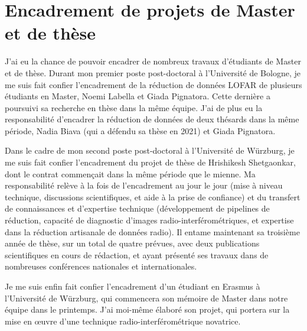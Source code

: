 \section{Encadrement de projets de Master et de th\`ese}

\pg
J'ai eu la chance de pouvoir encadrer de nombreux travaux d'\'etudiants de Master et de th\`ese. Durant mon premier poste post-doctoral \`a l'Universit\'e de Bologne, je me suis fait confier l'encadrement de la r\'eduction de donn\'ees LOFAR de plusieurs \'etudiants en Master, Noemi Labella et Giada Pignatora. Cette derni\`ere a poursuivi sa recherche en th\`ese dans la m\^eme \'equipe. J'ai de plus eu la responsabilit\'e d'encadrer la r\'eduction de donn\'ees de deux th\'esards dans la m\^eme p\'eriode, Nadia Biava (qui a d\'efendu sa th\`ese en 2021) et Giada Pignatora.

\pg
Dans le cadre de mon second poste post-doctoral \`a l'Universit\'e de W\"urzburg, je me suis fait confier l'encadrement du projet de th\`ese de Hrishikesh Shetgaonkar, dont le contrat commen\c{c}ait dans la m\^eme p\'eriode que le mienne. Ma responsabilit\'e rel\`eve \`a la fois de l'encadrement au jour le jour (mise \`a niveau technique, discussions scientifiques, et aide \`a la prise de confiance) et du transfert de connaissances et d'expertise technique (d\'eveloppement de pipelines de r\'eduction, capacit\'e de diagnostic d'images radio-interf\'erom\'etriques, et expertise dans la r\'eduction artisanale de donn\'ees radio). Il entame maintenant sa troisi\`eme ann\'ee de th\`ese, sur un total de quatre pr\'evues, avec deux publications scientifiques en cours de r\'edaction, et ayant pr\'esent\'e ses travaux dans de nombreuses conf\'erences nationales et internationales. 

\pg
Je me suis enfin fait confier l'encadrement d'un \'etudiant en Erasmus \`a l'Universit\'e de W\"urzburg, qui commencera son m\'emoire de Master dans notre \'equipe dans le printemps. J'ai moi-m\^eme \'elabor\'e son projet, qui portera sur la mise en {\oe}uvre d'une technique radio-interf\'erom\'etrique novatrice. 












